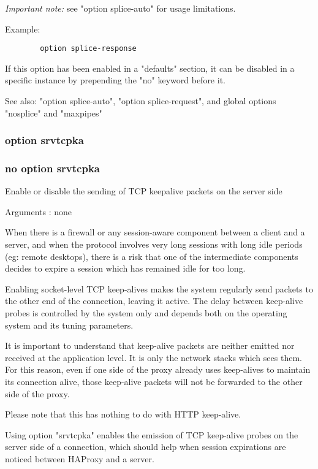  \emph{Important note:} see "option splice-auto" for usage limitations.

  Example:
  \begin{verbatim}
        option splice-response
  \end{verbatim}

  If this option has been enabled in a "defaults" section, it can be disabled
  in a specific instance by prepending the "no" keyword before it.

  See also: "option splice-auto", "option splice-request", and global options
             "nosplice" and "maxpipes"

\subsubsection{option srvtcpka}
\subsubsection{no option srvtcpka}


  Enable or disable the sending of TCP keepalive packets on the server side


  Arguments : none

  When there is a firewall or any session-aware component between a client and
  a server, and when the protocol involves very long sessions with long idle
  periods (eg: remote desktops), there is a risk that one of the intermediate
  components decides to expire a session which has remained idle for too long.

  Enabling socket-level TCP keep-alives makes the system regularly send packets
  to the other end of the connection, leaving it active. The delay between
  keep-alive probes is controlled by the system only and depends both on the
  operating system and its tuning parameters.

  It is important to understand that keep-alive packets are neither emitted nor
  received at the application level. It is only the network stacks which sees
  them. For this reason, even if one side of the proxy already uses keep-alives
  to maintain its connection alive, those keep-alive packets will not be
  forwarded to the other side of the proxy.

  Please note that this has nothing to do with HTTP keep-alive.

  Using option "srvtcpka" enables the emission of TCP keep-alive probes on the
  server side of a connection, which should help when session expirations are
  noticed between HAProxy and a server.


